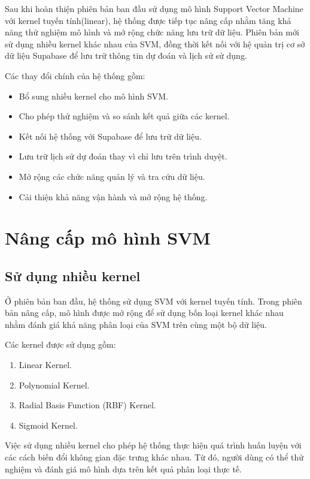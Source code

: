 \documentclass[12pt,a4paper]{report}
\begin{document}
	Sau khi hoàn thiện phiên bản ban đầu sử dụng mô hình Support Vector Machine  với kernel tuyến tính(linear), hệ thống được tiếp tục nâng cấp nhằm tăng khả năng thử nghiệm mô hình và mở rộng chức năng lưu trữ dữ liệu. Phiên bản mới sử dụng nhiều kernel khác nhau của SVM, đồng thời kết nối với hệ quản trị cơ sở dữ liệu Supabase để lưu trữ thông tin dự đoán và lịch sử sử dụng.
	
	\noindent
	Các thay đổi chính của hệ thống gồm:
	
	\begin{itemize}
		\item Bổ sung nhiều kernel cho mô hình SVM.
		\item Cho phép thử nghiệm và so sánh kết quả giữa các kernel.
		\item Kết nối hệ thống với Supabase để lưu trữ dữ liệu.
		\item Lưu trữ lịch sử dự đoán thay vì chỉ lưu trên trình duyệt.
		\item Mở rộng các chức năng quản lý và tra cứu dữ liệu.
		\item Cải thiện khả năng vận hành và mở rộng hệ thống.
	\end{itemize}
	

	\section{Nâng cấp mô hình SVM}
	
	\subsection{Sử dụng nhiều kernel}
	
	Ở phiên bản ban đầu, hệ thống sử dụng SVM với kernel tuyến tính. Trong phiên bản nâng cấp, mô hình được mở rộng để sử dụng bốn loại kernel khác nhau nhằm đánh giá khả năng phân loại của SVM trên cùng một bộ dữ liệu.
	
	\noindent
	Các kernel được sử dụng gồm:
	
	\begin{enumerate}
		\item Linear Kernel.
		\item Polynomial Kernel.
		\item Radial Basis Function (RBF) Kernel.
		\item Sigmoid Kernel.
	\end{enumerate}
	
	Việc sử dụng nhiều kernel cho phép hệ thống thực hiện quá trình huấn luyện với các cách biến đổi không gian đặc trưng khác nhau. Từ đó, người dùng có thể thử nghiệm và đánh giá mô hình dựa trên kết quả phân loại thực tế.
	
\end{document}
